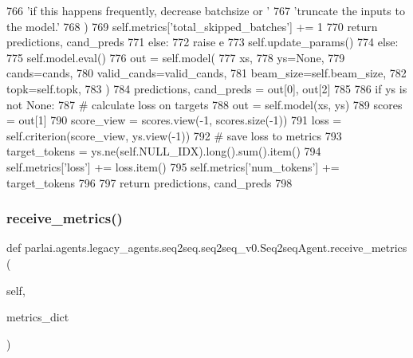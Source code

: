 \begin{DoxyCode}
766                         \textcolor{stringliteral}{'if this happens frequently, decrease batchsize or '}
767                         \textcolor{stringliteral}{'truncate the inputs to the model.'}
768                     )
769                     self.metrics[\textcolor{stringliteral}{'total\_skipped\_batches'}] += 1
770                     \textcolor{keywordflow}{return} predictions, cand\_preds
771                 \textcolor{keywordflow}{else}:
772                     \textcolor{keywordflow}{raise} e
773             self.update\_params()
774         \textcolor{keywordflow}{else}:
775             self.model.eval()
776             out = self.model(
777                 xs,
778                 ys=\textcolor{keywordtype}{None},
779                 cands=cands,
780                 valid\_cands=valid\_cands,
781                 beam\_size=self.beam\_size,
782                 topk=self.topk,
783             )
784             predictions, cand\_preds = out[0], out[2]
785 
786             \textcolor{keywordflow}{if} ys \textcolor{keywordflow}{is} \textcolor{keywordflow}{not} \textcolor{keywordtype}{None}:
787                 \textcolor{comment}{# calculate loss on targets}
788                 out = self.model(xs, ys)
789                 scores = out[1]
790                 score\_view = scores.view(-1, scores.size(-1))
791                 loss = self.criterion(score\_view, ys.view(-1))
792                 \textcolor{comment}{# save loss to metrics}
793                 target\_tokens = ys.ne(self.NULL\_IDX).long().sum().item()
794                 self.metrics[\textcolor{stringliteral}{'loss'}] += loss.item()
795                 self.metrics[\textcolor{stringliteral}{'num\_tokens'}] += target\_tokens
796 
797         \textcolor{keywordflow}{return} predictions, cand\_preds
798 
\end{DoxyCode}
\mbox{\label{classparlai_1_1agents_1_1legacy__agents_1_1seq2seq_1_1seq2seq__v0_1_1Seq2seqAgent_a584d45d729817694d615d2d545532af2}} 
\subsubsection{\texorpdfstring{receive\+\_\+metrics()}{receive\_metrics()}}
{\footnotesize\ttfamily def parlai.\+agents.\+legacy\+\_\+agents.\+seq2seq.\+seq2seq\+\_\+v0.\+Seq2seq\+Agent.\+receive\+\_\+metrics (\begin{DoxyParamCaption}\item[{}]{self,  }\item[{}]{metrics\+\_\+dict }\end{DoxyParamCaption})}

